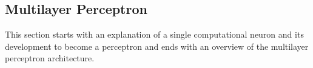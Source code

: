 \subsection{Multilayer Perceptron}
\label{sec:neural-networks-mlp}
This section starts with an explanation of a single computational neuron and its development to become a perceptron and ends with an overview of the multilayer perceptron architecture.



